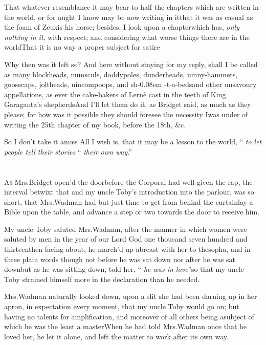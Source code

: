 \documentclass{article}
\begin{document}
\tsh That whatever resemblance it may bear to half the chapters which are written in
the world, or for aught I know may be now writing in it\tsk that it was as casual as
the foam of Zeuxis his horse; besides, I look upon a chapter\pb which has,
\textit{only nothing in it}, with respect; and considering what worse things there
are in the world\tsh That it is no way a proper subject for satire\tsh

\tsh Why then was it left so? And here without staying
for my reply, shall I be called as many blockheads, numsculs,
doddypoles, dunderheads, ninny-hammers, goosecaps, joltheads,
nincompoops, and sh-\kern 0.08em -t-a-beds\tsh and other unsavoury
appellations, as ever the cake-bakers of Lernè cast
in the teeth of King Garaganta’s
shepherds\tsh And I’ll let them do it, as
Bridget said, as much as they please; for how was it
possible they should foresee the necessity I\pb was under of writing
the 25th chapter of my book, before the 18th, \&c.

\tsh So I don’t take it amiss\tsh\break
All I wish is, that it may be a lesson to\break
the world, “ \textit{to let people tell their stories}\break
“ \textit{their own way}.”

\newpage
\section{}

\lettrine{A}{s} Mrs.\@ Bridget open’d the
door\break before the Corporal had well given the rap, the interval
betwixt that and my uncle Toby’s introduction into the
parlour, was so short, that Mrs.\@ Wadman had but just time to
get from behind the curtain\tsh lay a Bible upon the
table, and advance a step or two towards the door to receive
him.

My uncle Toby saluted Mrs.\@ Wadman, after the
manner in which women were saluted by men in the year of our Lord
God one thousand seven hundred and thirteen\tsh then
facing about, he march’d up abreast with her to the\pb sopha,
and in three plain words\tsh\break 
though not before he was sat down\tsh\break
nor after he was sat down\tsh\break but as he
was sitting down, told her,\break 
“ \textit{he was in love}”\tsh so that my uncle Toby strained
himself more in the declaration than he needed.

Mrs.\@ Wadman naturally looked down, upon a slit she had
been darning up in her apron, in expectation every moment, that my
uncle Toby would go on; but having no talents for
amplification, and  moreover of all others being a\break subject of
which he was the least a master\tsh When he had told 
Mrs.\@ Wadman once that he loved her, he let it alone, and left the
matter to work after its own way.
\end{document}
